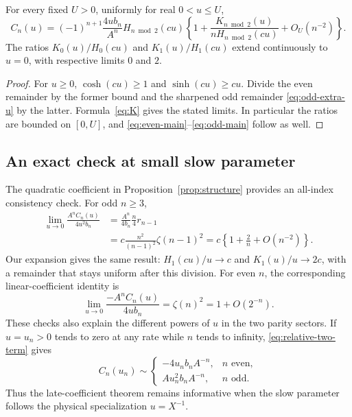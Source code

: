 \begin{corollary}
\label{cor:relative-two-term}
For every fixed $U>0$, uniformly for real $0<u\le U$,
\begin{equation}\label{eq:relative-two-term}
 C_n(u)=(-1)^{n+1}\frac{4ub_n}{A^n}H_{n\bmod2}(cu)
 \left\{1+\frac{K_{n\bmod2}(u)}{nH_{n\bmod2}(cu)}
                +O_U(n^{-2})\right\}.
\end{equation}
The ratios $K_0(u)/H_0(cu)$ and $K_1(u)/H_1(cu)$ extend continuously to
$u=0$, with respective limits $0$ and $2$.
\end{corollary}
\begin{proof}
For $u\ge0$, $\cosh(cu)\ge1$ and $\sinh(cu)\ge cu$. Divide the even
remainder by the former bound and the sharpened odd remainder
\eqref{eq:odd-extra-u} by the latter. Formula~\eqref{eq:K} gives the
stated limits. In particular the ratios are bounded on $[0,U]$, and
\eqref{eq:even-main}--\eqref{eq:odd-main} follow as well.
\end{proof}

\subsection{An exact check at small slow parameter}

The quadratic coefficient in Proposition~\ref{prop:structure} provides an
all-index consistency check. For odd $n\ge3$,
\begin{equation}\label{eq:small-u-exact}
 \begin{split}
 \lim_{u\to0}\frac{A^n C_n(u)}{4u^2b_n}
 &=\frac{A^n}{4b_n}\frac n4r_{n-1}\\
 &=c\frac{n^2}{(n-1)^2}\zeta(n-1)^2
 =c\left\{1+\frac2n+O(n^{-2})\right\}.
 \end{split}
\end{equation}
Our expansion gives the same result: $H_1(cu)/u\to c$ and
$K_1(u)/u\to2c$, with a remainder that stays uniform after this division.
For even $n$, the corresponding linear-coefficient identity is
\[
 \lim_{u\to0}\frac{-A^nC_n(u)}{4ub_n}=\zeta(n)^2
       =1+O(2^{-n}).
\]
These checks also explain the different powers of $u$ in the two parity
sectors. If $u=u_n>0$ tends to zero at any rate while $n$ tends to infinity,
\eqref{eq:relative-two-term} gives
\[
 C_n(u_n)\sim
 \begin{cases}
 -4u_n b_nA^{-n},&n\text{ even},\\
 A u_n^2b_nA^{-n},&n\text{ odd}.
 \end{cases}
\]
Thus the late-coefficient theorem remains informative when the slow
parameter follows the physical specialization $u=X^{-1}$.
